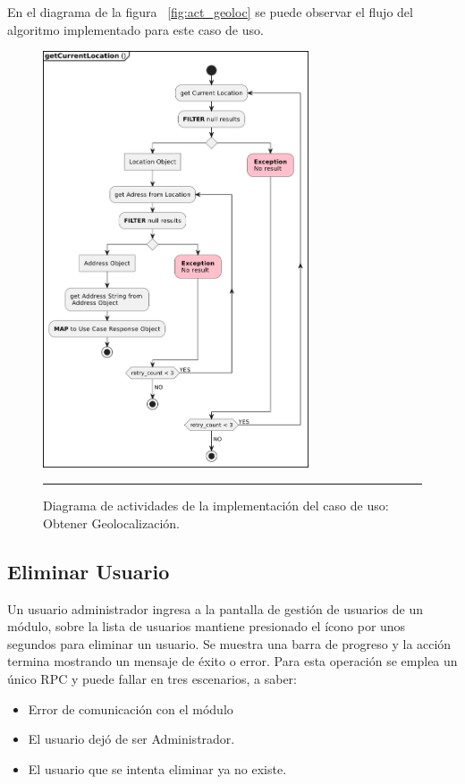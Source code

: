 En el diagrama de la figura ~\ref{fig:act_geoloc} se puede observar el flujo del algoritmo implementado para este caso de uso.

\begin{figure}[htbp]
	\centering
	\includegraphics[width=0.7\textwidth]{Figures/iter2/ACT_geoloc.png}
	\rule{35em}{1pt}
	\caption[Class Diagram]{Diagrama de actividades de la implementación del caso de uso: Obtener Geolocalización.}
	\label{fig:act_act_geoloc}
\end{figure}

\subsection{Eliminar Usuario}
Un usuario administrador ingresa a la pantalla de gestión de usuarios de un módulo, sobre la lista de usuarios mantiene presionado el ícono por unos segundos para eliminar un usuario. Se muestra una barra de progreso y la acción termina mostrando un mensaje de éxito o error.
Para esta operación se emplea un único RPC y puede fallar en tres escenarios, a saber:
\begin{itemize}
	\item Error de comunicación con el módulo
	\item El usuario dejó de ser Administrador.
	\item El usuario que se intenta eliminar ya no existe.
\end{itemize}


